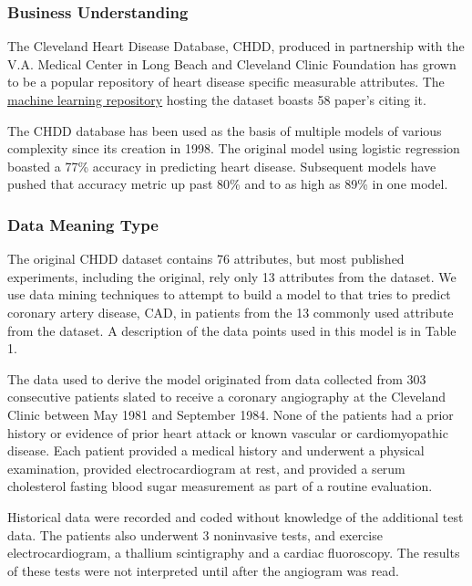 \documentclass[11pt]{article}
\begin{document}
    \subsubsection{Business Understanding}\label{business-understanding}

    The Cleveland Heart Disease Database, CHDD, produced in partnership with
the V.A. Medical Center in Long Beach and Cleveland Clinic Foundation
has grown to be a popular repository of heart disease specific
measurable attributes. The
\href{https://archive.ics.uci.edu/ml/datasets/Heart+Disease}{machine
learning repository} hosting the dataset boasts 58 paper's citing it.

The CHDD database has been used as the basis of multiple models of
various complexity since its creation in 1998. The original model using
logistic regression boasted a 77\% accuracy in predicting heart disease.
Subsequent models have pushed that accuracy metric up past 80\% and to
as high as 89\% in one model.

    \subsubsection{Data Meaning Type}\label{data-meaning-type}

The original CHDD dataset contains 76 attributes, but most published
experiments, including the original, rely only 13 attributes from the
dataset. We use data mining techniques to attempt to build a model to
that tries to predict coronary artery disease, CAD, in patients from the
13 commonly used attribute from the dataset. A description of the data
points used in this model is in Table 1.

The data used to derive the model originated from data collected from
303 consecutive patients slated to receive a coronary angiography at the
Cleveland Clinic between May 1981 and September 1984. None of the
patients had a prior history or evidence of prior heart attack or known
vascular or cardiomyopathic disease. Each patient provided a medical
history and underwent a physical examination, provided electrocardiogram
at rest, and provided a serum cholesterol fasting blood sugar
measurement as part of a routine evaluation.

Historical data were recorded and coded without knowledge of the
additional test data. The patients also underwent 3 noninvasive tests,
and exercise electrocardiogram, a thallium scintigraphy and a cardiac
fluoroscopy. The results of these tests were not interpreted until after
the angiogram was read.
\end{document}
